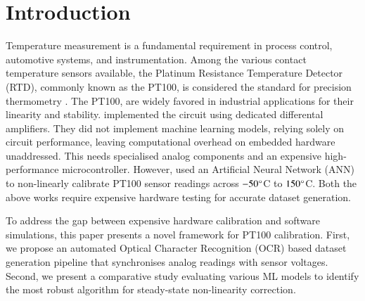 \documentclass[conference]{IEEEtran}
\begin{document}

\section{Introduction}
Temperature measurement is a fundamental requirement in process control, automotive systems, and instrumentation. Among the various contact temperature sensors available, the Platinum Resistance Temperature Detector (RTD), commonly known as the PT100, is considered the standard for precision thermometry \cite{rtd_theory}. The PT100, are widely favored in industrial applications for their linearity and stability. \cite{paper2} implemented the circuit using dedicated differental amplifiers. They did not implement machine learning models, relying solely on circuit performance, leaving computational overhead on embedded hardware unaddressed. This needs specialised analog components and an expensive high-performance microcontroller. However, \cite{paper1} used an Artificial Neural Network (ANN) to non-linearly calibrate PT100 sensor readings across $-50 \degree$C to $150 \degree$C. Both the above works require expensive hardware testing for accurate dataset generation.

To address the gap between expensive hardware calibration and software simulations, this paper presents a novel framework for PT100 calibration. First, we propose an automated Optical Character Recognition (OCR) based dataset generation pipeline that synchronises analog readings with sensor voltages. Second, we present a comparative study evaluating various ML models to identify the most robust algorithm for steady-state non-linearity correction.
\end{document}
